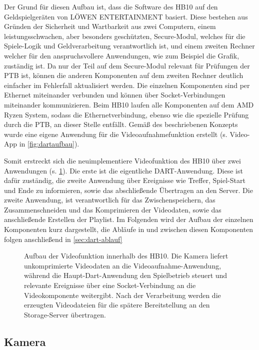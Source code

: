 Der Grund für diesen Aufbau ist, dass die Software des HB10 auf den Geldspielgeräten von LÖWEN ENTERTAINMENT basiert. Diese bestehen aus Gründen der Sicherheit und Wartbarkeit aus zwei Computern, einem leistungsschwachen, aber besonders geschützten, Secure-Modul, 
welches für die Spiele-Logik und Geldverarbeitung verantwortlich ist, und einem zweiten Rechner welcher für den anspruchsvollere Anwendungen, wie zum Beispiel die Grafik, zuständig ist. Da nur der Teil auf dem Secure-Modul relevant für Prüfungen der \ac{PTB}\cite{PTBSpielgeraete} ist, 
können die anderen Komponenten auf dem zweiten Rechner deutlich einfacher im Fehlerfall aktualisiert werden. Die einzelnen Komponenten sind per Ethernet miteinander verbunden und können über Socket-Verbindungen miteinander kommunizieren. Beim HB10 laufen alle Komponenten auf dem AMD Ryzen System, 
sodass die Ethernetverbindung, ebenso wie die spezielle Prüfung durch die \ac{PTB}, an dieser Stelle entfällt. Gemäß des beschriebenen Konzepts wurde eine eigene Anwendung für die Videoaufnahmefunktion erstellt (s. Video-App in \cref{fig:dartaufbau}).

Somit erstreckt sich die neuimplementiere Videofunktion des HB10 über zwei Anwendungen (s. \cref{fig:videoaufbau}). Die erste ist die eigentliche DART-Anwendung. Diese ist dafür zuständig, die zweite Anwendung über Ereignisse wie Treffer, Spiel-Start und Ende zu informieren,
sowie das abschließende Übertragen an den Server. Die zweite Anwendung, ist verantwortlich für das Zwischenspeichern, das Zusammenschneiden und das Komprimieren der Videodaten, sowie das anschließende Erstellen der Playlist. Im Folgenden wird der Aufbau der einzelnen Komponenten kurz dargestellt,
die Abläufe in und zwischen diesen Komponenten folgen anschließend in \cref{sec:dart-ablauf}

\begin{figure}[h]
    \centering
    
    \caption[Aufbau der Videofunktion im HB10]{Aufbau der Videofunktion innerhalb des HB10. Die Kamera liefert unkomprimierte Videodaten an die Videoaufnahme-Anwendung, während die Haupt-Dart-Anwendung den Spielbetrieb steuert und relevante Ereignisse über eine Socket-Verbindung an die Videokomponente weitergibt. 
    Nach der Verarbeitung werden die erzeugten Videodateien für die spätere Bereitstellung an den Storage-Server übertragen.}
    \label{fig:videoaufbau}
\end{figure}

\subsection{Kamera}

